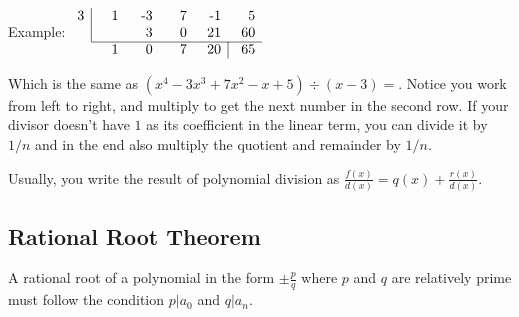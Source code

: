 Example:
$\begin{array}{c|rrrrr} 3&\parbox[b]{0.2in}{\raggedleft 1}&\parbox[b]{0.2in}{\raggedleft -3}&\parbox[b]{0.2in}{\raggedleft 7}&\parbox[b]{0.2in}{\raggedleft -1}&\parbox[b]{0.2in}{\raggedleft 5}\\ &&{3}&{0}&21&60 \\\cline{2-6} \multicolumn{2}{r}{{1}}& {0}&7&20&\multicolumn{1}{|r}{65} \end{array}$

Which is the same as $(x^4 - 3x^3 + 7x^2 - x + 5) \div (x - 3) = $. Notice you work from left to right, and multiply to get the next number in the second row.
If your divisor doesn't have $1$ as its coefficient in the linear term, you can divide it by $1/n$ and in the end also multiply the quotient and remainder by $1/n$.

Usually, you write the result of polynomial division as $\frac{f(x)}{d(x)}=q(x)+\frac{r(x)}{d(x)}$.

\subsection{Rational Root Theorem}
A rational root of a polynomial in the form $\pm\frac{p}{q}$ where $p$ and $q$ are relatively prime must follow the condition
$p | a_0$ and $q | a_n$.